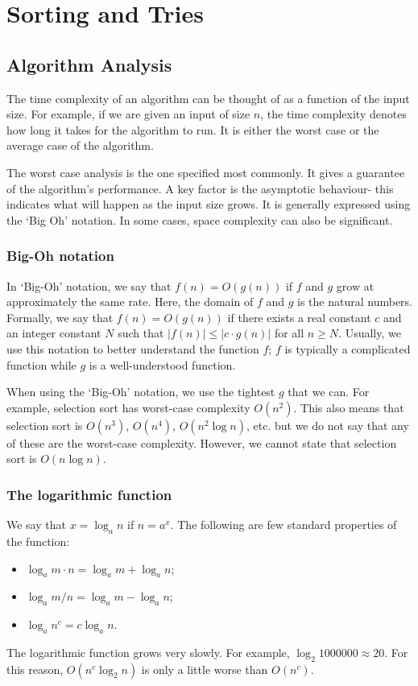 \documentclass[a4paper, openany]{memoir}
\begin{document}
\chapter{Sorting and Tries}
\setcounter{section}{-1}

\section{Algorithm Analysis}
The time complexity of an algorithm can be thought of as a function of the input size. For example, if we are given an input of size $n$, the time complexity denotes how long it takes for the algorithm to run. It is either the worst case or the average case of the algorithm. 

The worst case analysis is the one specified most commonly. It gives a guarantee of the algorithm's performance. A key factor is the asymptotic behaviour- this indicates what will happen as the input size grows. It is generally expressed using the `Big Oh' notation. In some cases, space complexity can also be significant.

\subsection{Big-Oh notation}
In `Big-Oh' notation, we say that $f(n) = O(g(n))$ if $f$ and $g$ grow at approximately the same rate. Here, the domain of $f$ and $g$ is the natural numbers. Formally, we say that $f(n) = O(g(n))$ if there exists a real constant $c$ and an integer constant $N$ such that $|f(n)| \leq |c \cdot g(n)|$ for all $n \geq N$. Usually, we use this notation to better understand the function $f$; $f$ is typically a complicated function while $g$ is a well-understood function.

When using the `Big-Oh' notation, we use the tightest $g$ that we can. For example, selection sort has worst-case complexity $O(n^2)$. This also means that selection sort is $O(n^3)$, $O(n^4)$, $O(n^2 \log n)$, etc. but we do not say that any of these are the worst-case complexity. However, we cannot state that selection sort is $O(n \log n)$.

\subsection{The logarithmic function}
We say that $x = \log_a n$ if $n = a^x$. The following are few standard properties of the function:
\begin{itemize}
    \item $\log_a m \cdot n = \log_a m + \log_a n$;
    \item $\log_a m/n = \log_a m - \log_a n$;
    \item $\log_a n^c = c \log_a n$.
\end{itemize}
The logarithmic function grows very slowly. For example, $\log_2 1 000 000 \approx 20$. For this reason, $O(n^c \log_2 n)$ is only a little worse than $O(n^c)$.
\end{document}
